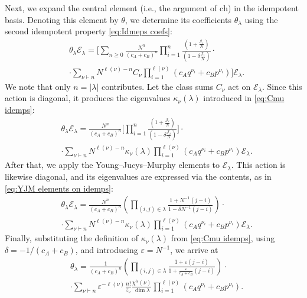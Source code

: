 \documentclass{article}
\theoremstyle{plain}
\theoremstyle{definition}
\numberwithin{equation}{section}
\begin{document}
Next, we expand the central element (i.e., the argument of $\mathrm{ch}$) in the idempotent basis. Denoting this element by $\theta$, we determine its coefficients $\theta_\lambda$ using the second idempotent property \eqref{eq:Idmeps coefs}:
\begin{equation}
    \begin{aligned}
        & \theta_\lambda \mathcal{E}_\lambda = \Bigg[\sum_{n\ge0} \frac{N^{n}}{(c_A+c_B)^{n}} \prod_{i=1}^n \frac{\left(1+\frac{\mathcal{J}_i}{N}\right)}{\left(1- \delta \frac{\mathcal{J}_i}{N}\right)} \cdot \\
        & \cdot \sum_{\nu \vdash n}   N^{\ell(\nu)-n} C_\nu \prod_{i=1}^{\ell(\nu)} (c_A q^{\nu_i} + c_B p^{\nu_i})\Bigg] \mathcal{E}_\lambda.
    \end{aligned}
\end{equation}
We note that only $n = |\lambda|$ contributes. Let the class sums $C_\nu$ act on $\mathcal{E}_\lambda$. Since this action is diagonal, it produces the eigenvalues $\kappa_\nu(\lambda)$ introduced in \eqref{eq:Cmu idemps}:
\begin{equation}
    \begin{aligned}
        & \theta_\lambda \mathcal{E}_\lambda = \frac{N^{n}}{(c_A+c_B)^{n} } \Bigg[\prod_{i=1}^n \frac{\left(1+\frac{\mathcal{J}_i}{N}\right)}{\left(1- \delta \frac{\mathcal{J}_i}{N}\right)} \Bigg] \cdot \\
        &  \cdot \sum_{\nu \vdash n}   N^{\ell(\nu)-n} \kappa_\nu(\lambda) \prod_{i=1}^{\ell(\nu)} (c_A q^{\nu_i} + c_B p^{\nu_i})\mathcal{E}_\lambda.
    \end{aligned}
\end{equation}
After that, we apply the Young--Jucys--Murphy elements to $\mathcal{E}_\lambda$. This action is likewise diagonal, and its eigenvalues are expressed via the contents, as in \eqref{eq:YJM elements on idemps}:
\begin{equation}
    \begin{aligned}
        & \theta_\lambda \mathcal{E}_\lambda = \frac{N^{n}}{(c_A+c_B)^{n} } \left(\prod_{(i,j) \in \lambda} \frac{1+ N^{-1} (j-i)}{1-\delta N^{-1} (j-i)}\right) \cdot \\
        &  \cdot \sum_{\nu \vdash n}   N^{\ell(\nu)-n} \kappa_\nu(\lambda) \prod_{i=1}^{\ell(\nu)} (c_A q^{\nu_i} + c_B p^{\nu_i})\mathcal{E}_\lambda.
    \end{aligned}
\end{equation}
Finally, substituting the definition of $\kappa_\nu(\lambda)$ from \eqref{eq:Cmu idemps}, using $\delta = - 1/(c_A+c_B)$, and introducing $\varepsilon = N^{-1}$, we arrive at
\begin{equation}
    \begin{aligned}
        & \theta_\lambda = \frac{1}{(c_A+c_B)^{n} } \left(\prod_{(i,j) \in \lambda} \frac{1+ \varepsilon (j-i)}{1+ \frac{\varepsilon}{c_A+c_B} (j-i)}\right) \cdot \\
        &  \cdot \sum_{\nu \vdash n}   \varepsilon^{-\ell(\nu)} \frac{n!}{z_\nu} \frac{\chi^\lambda(\nu)}{\dim \lambda} \prod_{i=1}^{\ell(\nu)} (c_A q^{\nu_i} + c_B p^{\nu_i}).
    \end{aligned}
\end{equation}
\end{document}
